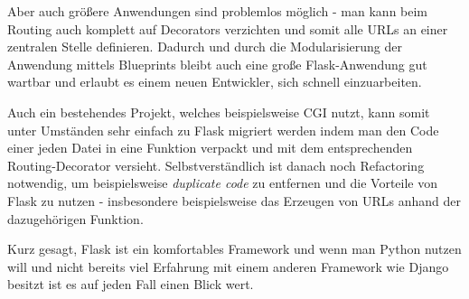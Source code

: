 Aber auch größere Anwendungen sind problemlos möglich - man kann beim Routing auch komplett auf
Decorators verzichten und somit alle URLs an einer zentralen Stelle definieren. Dadurch und durch
die Modularisierung der Anwendung mittels Blueprints bleibt auch eine große Flask-Anwendung gut
wartbar und erlaubt es einem neuen Entwickler, sich schnell einzuarbeiten.

Auch ein bestehendes Projekt, welches beispielsweise CGI nutzt, kann somit unter Umständen sehr
einfach zu Flask migriert werden indem man den Code einer jeden Datei in eine Funktion verpackt und
mit dem entsprechenden Routing-Decorator versieht. Selbstverständlich ist danach noch Refactoring
notwendig, um beispielsweise \emph{duplicate code} zu entfernen und die Vorteile von Flask zu nutzen
- insbesondere beispielsweise das Erzeugen von URLs anhand der dazugehörigen Funktion.

Kurz gesagt, Flask ist ein komfortables Framework und wenn man Python nutzen will und nicht bereits
viel Erfahrung mit einem anderen Framework wie Django besitzt ist es auf jeden Fall einen Blick
wert.
